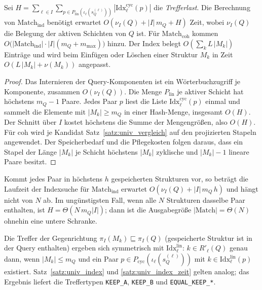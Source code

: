 \begin{satz}
	\label{satz:univ_index_zeit}
	Sei $H=\sum_{\ell\in I}\sum_{p\in P_{\mathrm{lin}}(\iota_\ell(s_Q^{(\ell)}))}|\mathrm{Idx}^{\mathrm{cyc}}_\ell(p)|$ die \emph{Trefferlast}. Die Berechnung von $\mathrm{Match}_{\mathrm{ind}}$ benötigt erwartet $O(\nu_I(Q)+|I|\,m_Q+H)$ Zeit, wobei $\nu_I(Q)$ die Belegung der aktiven Schichten von $Q$ ist. Für $\mathrm{Match}_{\mathrm{coh}}$ kommen $O\big(|\mathrm{Match}_{\mathrm{ind}}|\cdot|I|(m_Q+m_{\max})\big)$ hinzu. Der Index belegt $O(\sum_k L\,|M_k|)$ Einträge und wird beim Einfügen oder Löschen einer Struktur $M_k$ in Zeit $O(L\,|M_k|+\nu(M_k))$ angepasst.
\end{satz}

\begin{proof}
	Das Internieren der Query-Komponenten ist ein Wörterbuchzugriff je Komponente, zusammen $O(\nu_I(Q))$. Die Menge $P_{\mathrm{lin}}$ je aktiver Schicht hat höchstens $m_Q-1$ Paare. Jedes Paar $p$ liest die Liste $\mathrm{Idx}^{\mathrm{cyc}}_\ell(p)$ einmal und sammelt die Elemente mit $|M_k|\ge m_Q$ in einer Hash-Menge, insgesamt $O(H)$. Der Schnitt über $I$ kostet höchstens die Summe der Mengengrößen, also $O(H)$. Für coh wird je Kandidat Satz~\ref{satz:univ_vergleich} auf den projizierten Stapeln angewendet. Der Speicherbedarf und die Pflegekosten folgen daraus, dass ein Stapel der Länge $|M_k|$ je Schicht höchstens $|M_k|$ zyklische und $|M_k|-1$ lineare Paare besitzt.
\end{proof}

\begin{korollar}
	\label{kor:univ_unabhaengig}
	Kommt jedes Paar in höchstens $h$ gespeicherten Strukturen vor, so beträgt die Laufzeit der Indexsuche für $\mathrm{Match}_{\mathrm{ind}}$ erwartet $O(\nu_I(Q)+|I|\,m_Q\,h)$ und hängt nicht von $N$ ab. Im ungünstigsten Fall, wenn alle $N$ Strukturen dasselbe Paar enthalten, ist $H=\Theta(N\,m_Q|I|)$; dann ist die Ausgabegröße $|\mathrm{Match}|=\Theta(N)$ ohnehin eine untere Schranke.
\end{korollar}

\begin{bemerkung}
	Die Treffer der Gegenrichtung $\pi_I(M_k)\sqsubseteq\pi_I(Q)$ (gespeicherte Struktur ist in der Query enthalten) ergeben sich symmetrisch mit $\mathrm{Idx}^{\mathrm{lin}}_\ell$: $k\in R'_\ell(Q)$ genau dann, wenn $|M_k|\le m_Q$ und ein Paar $p\in P_{\mathrm{cyc}}(\iota_\ell(s_Q^{(\ell)}))$ mit $k\in\mathrm{Idx}^{\mathrm{lin}}_\ell(p)$ existiert. Satz~\ref{satz:univ_index} und \ref{satz:univ_index_zeit} gelten analog; das Ergebnis liefert die Treffertypen \texttt{KEEP\_A}, \texttt{KEEP\_B} und \texttt{EQUAL\_KEEP\_*}.
\end{bemerkung}

